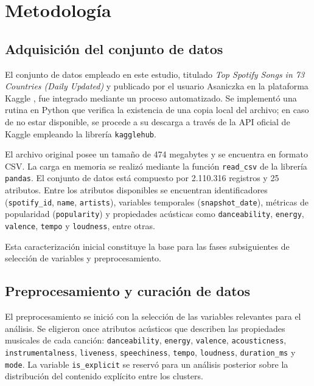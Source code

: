 \section{Metodología}

\subsection{Adquisición del conjunto de datos}

El conjunto de datos empleado en este estudio, titulado \textit{Top Spotify Songs in 73 Countries (Daily Updated)} y publicado por el usuario Asaniczka en la plataforma Kaggle \cite{asaniczka2025}, fue integrado mediante un proceso automatizado. Se implementó una rutina en Python que verifica la existencia de una copia local del archivo; en caso de no estar disponible, se procede a su descarga a través de la API oficial de Kaggle empleando la librería \texttt{kagglehub}.

El archivo original posee un tamaño de 474 megabytes y se encuentra en formato CSV. La carga en memoria se realizó mediante la función \texttt{read\_csv} de la librería \texttt{pandas}. El conjunto de datos está compuesto por 2.110.316 registros y 25 atributos. Entre los atributos disponibles se encuentran identificadores (\texttt{spotify\_id}, \texttt{name}, \texttt{artists}), variables temporales (\texttt{snapshot\_date}), métricas de popularidad (\texttt{popularity}) y propiedades acústicas como \texttt{danceability}, \texttt{energy}, \texttt{valence}, \texttt{tempo} y \texttt{loudness}, entre otras.

Esta caracterización inicial constituye la base para las fases subsiguientes de selección de variables y preprocesamiento.

\subsection{Preprocesamiento y curación de datos}

El preprocesamiento se inició con la selección de las variables relevantes para el análisis. Se eligieron once atributos acústicos que describen las propiedades musicales de cada canción: \texttt{danceability}, \texttt{energy}, \texttt{valence}, \texttt{acousticness}, \texttt{instrumentalness}, \texttt{liveness}, \texttt{speechiness}, \texttt{tempo}, \texttt{loudness}, \texttt{duration\_ms} y \texttt{mode}. La variable \texttt{is\_explicit} se reservó para un análisis posterior sobre la distribución del contenido explícito entre los clusters.

